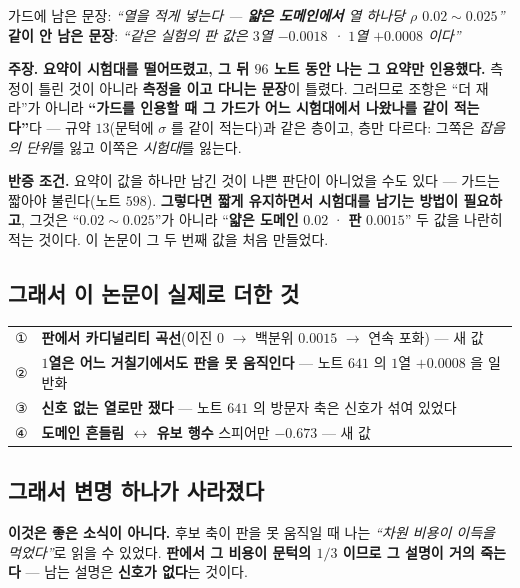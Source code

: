 \documentclass[10pt,a4paper]{article}
\newcommand{\claim}[2]{\begin{claimbox}\textbf{주장.} #1\par\smallskip
  \textcolor{gray!70}{\textbf{반증 조건.} #2}\end{claimbox}}
\begin{document}
\begin{center}
가드에 남은 문장: \emph{``열을 적게 넣는다 --- \textbf{얇은 도메인에서} 열 하나당
$\rho$ $0.02{\sim}0.025$''}\\
\textbf{같이 안 남은 문장}: \emph{``같은 실험의 판 값은 $3$열 $-0.0018$ ·
$1$열 $+0.0008$ 이다''}
\end{center}

\claim{\textbf{요약이 시험대를 떨어뜨렸고, 그 뒤 $96$ 노트 동안 나는 그 요약만
인용했다.} 측정이 틀린 것이 아니라 \textbf{측정을 이고 다니는 문장}이 틀렸다.
그러므로 조항은 ``더 재라''가 아니라 \textbf{``가드를 인용할 때 그 가드가 어느
시험대에서 나왔나를 같이 적는다''}다 --- 규약 $13$(문턱에 $\sigma$ 를 같이 적는다)과
같은 층이고, 층만 다르다: 그쪽은 \emph{잡음의 단위}를 잃고 이쪽은 \emph{시험대}를
잃는다.}
{요약이 값을 하나만 남긴 것이 나쁜 판단이 아니었을 수도 있다 --- 가드는 짧아야
불린다(노트 $598$). \textbf{그렇다면 짧게 유지하면서 시험대를 남기는 방법이
필요하고}, 그것은 ``$0.02{\sim}0.025$''가 아니라 ``\textbf{얇은 도메인} $0.02$ ·
\textbf{판} $0.0015$'' 두 값을 나란히 적는 것이다. 이 논문이 그 두 번째 값을
처음 만들었다.}

\subsection*{그래서 이 논문이 실제로 더한 것}

\begin{center}
\begin{tabular}{ll}
\toprule
① & \textbf{판에서 카디널리티 곡선}(이진 $0$ $\to$ 백분위 $0.0015$ $\to$ 연속 포화) --- 새 값 \\
② & \textbf{$1$열은 어느 거칠기에서도 판을 못 움직인다} --- 노트 $641$ 의 $1$열 $+0.0008$ 을 일반화 \\
③ & \textbf{신호 없는 열로만 쟀다} --- 노트 $641$ 의 방문자 축은 신호가 섞여 있었다 \\
④ & \textbf{도메인 흔들림 $\leftrightarrow$ 유보 행수} 스피어만 $-0.673$ --- 새 값 \\
\bottomrule
\end{tabular}
\end{center}

\subsection*{그래서 변명 하나가 사라졌다}

\textbf{이것은 좋은 소식이 아니다.} 후보 축이 판을 못 움직일 때 나는 \emph{``차원
비용이 이득을 먹었다''}로 읽을 수 있었다. \textbf{판에서 그 비용이 문턱의 $1/3$
이므로 그 설명이 거의 죽는다} --- 남는 설명은 \textbf{신호가 없다}는 것이다.
\end{document}
